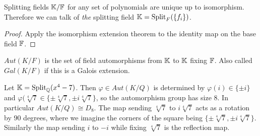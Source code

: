 \documentclass[11pt]{article}
\begin{document}
\begin{corollary}
  Splitting fields $\mathbb{K}/\mathbb{F}$ for any set of polynomials are unique up to isomorphism. Therefore we can talk of \textit{the} splitting field $\mathbb{K} = \text{Split}_F(\{f_i\})$.
\end{corollary}
\begin{proof}
  Apply the isomorphism extension theorem to the identity map on the base field $\mathbb{F}$.
\end{proof}

\begin{definition}
  $Aut(K/F)$ is the set of field automorphisms from $\mathbb{K}$ to $\mathbb{K}$ fixing $\mathbb{F}$. Also called $Gal(K/F)$ if this is a Galois extension.
\end{definition}
\begin{example}
  Let $\mathbb{K} = \text{Split}_{\mathbb{Q}}(x^4 - 7)$. Then $\varphi \in Aut(K/Q)$ is determined by $\varphi(i) \in \{\pm i\}$ and $\varphi(\sqrt[4]{7} \in \{\pm\sqrt[4]{7}, \pm i\sqrt[4]{7}\}$, so the automorphism group has size $8$. In particular $Aut(K/Q) \cong D_8$. The map sending $\sqrt[4]{7}$ to $i\sqrt[4]{7}$ acts as a rotation by $90$ degrees, where we imagine the corners of the square being $\{\pm\sqrt[4]{7}, \pm i\sqrt[4]{7}\}$. Similarly the map sending $i$ to $-i$ while fixing $\sqrt[4]{7}$ is the reflection map.
\end{example}
  
\end{document}

